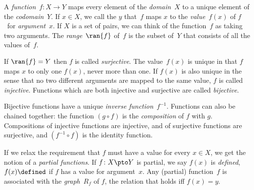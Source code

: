 A \emph{function}~$f\colon X \to Y$ maps every element of the
\emph{domain}~$X$ to a unique element of the \emph{codomain}~$Y$. If
$x \in X$, we call the $y$ that~$f$ maps $x$ to the
\emph{value}~$f(x)$ of $f$~for \emph{argument}~$x$. If $X$ is a set of
pairs, we can think of the function~$f$ as taking two arguments. The
\emph{range}~$\ran{f}$ of~$f$ is the subset of~$Y$ that consists of
all the values of~$f$.

If $\ran{f} = Y$ then $f$ is called \emph{surjective}. The value~$f(x)$
is unique in that $f$ maps $x$ to only one $f(x)$, never more than one.
If $f(x)$ is also unique in the sense that no two different arguments
are mapped to the same value, $f$ is called \emph{injective}. Functions
which are both injective and surjective are called \emph{bijective}.

Bijective functions have a unique \emph{inverse function}~$f^{-1}$.
Functions can also be chained together: the function $(g \circ f)$ is
the \emph{composition} of $f$ with $g$. Compositions of injective
functions are injective, and of surjective functions are surjective,
and $(f^{-1} \circ f)$ is the identity function.

If we relax the requirement that $f$ must have a value for every $x
\in X$, we get the notion of a \emph{partial functions}. If $f\colon
X \pto Y$ is partial, we say $f(x)$ is \emph{defined}, $f(x) \defined$
if $f$ has a value for argument~$x$. Any (partial) function~$f$ is
associated with the \emph{graph}~$R_f$ of $f$, the relation that holds
iff $f(x) = y$.
